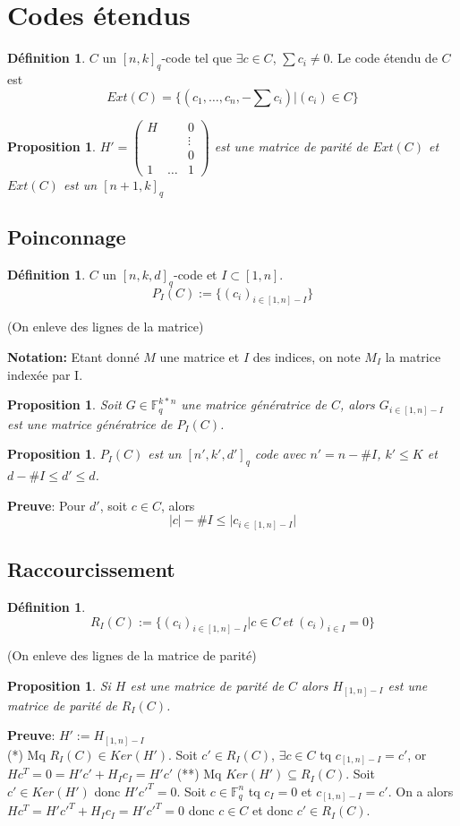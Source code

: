 \documentclass[12pt]{article}
\theoremstyle{plain}
\newtheorem{prop}[subsubsection]{Proposition}
\theoremstyle{definition}
\newtheorem{defn}[subsubsection]{D\'efinition}
\theoremstyle{remark}
\newcommand{\F}{\mathbb{F}}
\begin{document}
\section{Codes étendus}
\begin{defn}
    $C$ un $[n,k]_q$-code tel que $\exists c\in C$, $\sum c_i\ne 0$. Le code 
    étendu de $C$ est \[Ext(C)=\{(c_1,\ldots, c_n, -\sum c_i)|(c_i)\in C\}\]
\end{defn}
\begin{prop}
    $H'=\begin{pmatrix}
        H&&0\\
         &&\vdots\\
         &&0\\
        1&\ldots&1
    \end{pmatrix}$
    est une matrice de parité de $Ext(C)$ et $Ext(C)$ est un 
    $[n+1,k]_q$
\end{prop}
\subsection{Poinconnage}
\begin{defn}
    $C$ un $[n,k,d]_q$-code et $I\subset [1,n]$. 
    \[
        P_I(C):=\{(c_i)_{i\in[1,n]-I}\}
    \] 
\end{defn}
(On enleve des lignes de la matrice)

\textbf{Notation:} Etant donné $M$ une matrice et $I$ des indices, on note $M_I$ la matrice indexée par I.

\begin{prop}
    Soit $G\in \F_q^{k*n}$ une matrice génératrice de $C$, alors 
    $G_{i\in[1,n]-I}$ est une matrice génératrice de $P_I(C)$.
\end{prop}
\begin{prop}
    $P_I(C)$ est un $[n',k',d']_q$ code avec $n'=n-\# I$, $k'\leq K$ 
    et $d-\#I\leq d'\leq d$.
\end{prop}
\textbf{Preuve}: Pour $d'$, soit $c\in C$, alors 
\[\lvert c\rvert-\#I\leq\lvert c_{i\in[1,n]-I}\rvert \]
\subsection{Raccourcissement}
\begin{defn}
    \[R_I(C):=\{(c_i)_{i\in[1,n]-I}| c\in C~et~(c_i)_{i\in I}=0\}\]
\end{defn}
(On enleve des lignes de la matrice de parité)
\begin{prop}
    Si $H$ est une matrice de parité de $C$ alors
    $H_{[1,n]-I}$ est une matrice de parité de $R_I(C)$.
\end{prop}
\textbf{Preuve}: $H':=H_{[1,n]-I}$\\
(*) Mq $R_I(C)\in Ker(H')$. Soit $c'\in R_I(C)$, $\exists c\in C$ tq 
$c_{[1,n]-I}=c'$, or $Hc^T=0=H'c'+H_Ic_I=H'c'$
(**) Mq $Ker(H')\subseteq R_I(C)$. Soit $c'\in Ker(H')$ donc 
$H'c'^T=0$. Soit $c\in \F_q^n$ tq $c_I=0$ et $c_{[1,n]-I}=c'$. On a 
alors $Hc^T=H'c'^T+H_Ic_I=H'c'^T=0$ donc $c\in C$ et donc $c'\in R_I(C)$.
\end{document}
